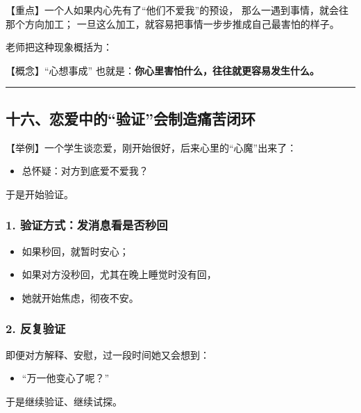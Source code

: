 \documentclass[
  chinese,
  9pt,
  a4paper,
]{ctexart}
\providecommand{\tightlist}{%
  \setlength{\itemsep}{0pt}\setlength{\parskip}{0pt}}
\begin{document}
【重点】一个人如果内心先有了``他们不爱我''的预设，
那么一遇到事情，就会往那个方向加工；
一旦这么加工，就容易把事情一步步推成自己最害怕的样子。

老师把这种现象概括为：

【概念】``心想事成''
也就是：\textbf{你心里害怕什么，往往就更容易发生什么。}

\begin{center}\rule{0.5\linewidth}{0.5pt}\end{center}

\subsection{十六、恋爱中的``验证''会制造痛苦闭环}\label{ux5341ux516dux604bux7231ux4e2dux7684ux9a8cux8bc1ux4f1aux5236ux9020ux75dbux82e6ux95edux73af}

【举例】一个学生谈恋爱，刚开始很好，后来心里的``心魔''出来了：

\begin{itemize}
\tightlist
\item
  总怀疑：对方到底爱不爱我？
\end{itemize}

于是开始验证。

\subsubsection{1.
验证方式：发消息看是否秒回}\label{ux9a8cux8bc1ux65b9ux5f0fux53d1ux6d88ux606fux770bux662fux5426ux79d2ux56de}

\begin{itemize}
\tightlist
\item
  如果秒回，就暂时安心；
\item
  如果对方没秒回，尤其在晚上睡觉时没有回，
\item
  她就开始焦虑，彻夜不安。
\end{itemize}

\subsubsection{2. 反复验证}\label{ux53cdux590dux9a8cux8bc1}

即便对方解释、安慰，过一段时间她又会想到：

\begin{itemize}
\tightlist
\item
  ``万一他变心了呢？''
\end{itemize}

于是继续验证、继续试探。
\end{document}

